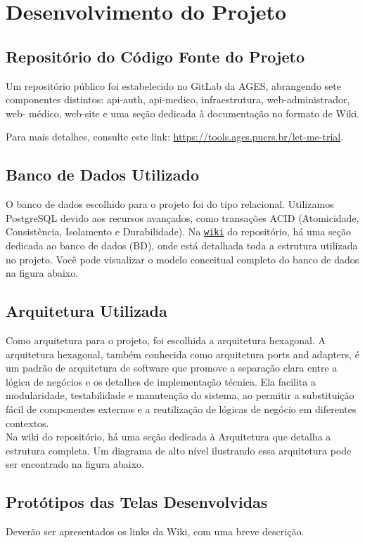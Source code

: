 \section[Desenvolvimento do Projeto]{Desenvolvimento do Projeto}



\subsection*{Repositório do Código Fonte do Projeto}
    Um repositório público foi estabelecido no GitLab da AGES, abrangendo sete componentes distintos: api-auth, api-medico, infraestrutura, web-administrador, web- médico, web-site e uma seção dedicada à documentação no formato de Wiki.

    Para mais detalhes, consulte este link:
    {\url{https://tools.ages.pucrs.br/let-me-trial}}.


\subsection{Banco de Dados Utilizado}
  O banco de dados escolhido para o projeto foi do tipo relacional. Utilizamos PostgreSQL devido aos recursos avançados, como transações ACID (Atomicidade, Consistência, Isolamento e Durabilidade). Na \texttt{\href{http://example.com}{wiki}} do repositório, há uma seção dedicada ao banco de dados (BD), onde está detalhada toda a estrutura utilizada no projeto. Você pode visualizar o modelo conceitual completo do banco de dados na figura abaixo.


\subsection{Arquitetura Utilizada}
  Como arquitetura para o projeto, foi escolhida a arquitetura hexagonal. A arquitetura hexagonal, também conhecida como arquitetura ports and adapters, é um padrão de arquitetura de software que promove a separação clara entre a lógica de negócios e os detalhes de implementação técnica. Ela facilita a modularidade, testabilidade e manutenção do sistema, ao permitir a substituição fácil de componentes externos e a reutilização de lógicas de negócio em diferentes contextos.\\
    Na wiki do repositório, há uma seção dedicada à Arquitetura que detalha a estrutura completa. Um diagrama de alto nível ilustrando essa arquitetura pode ser encontrado na figura abaixo.


\subsection{Protótipos das Telas Desenvolvidas}
  Deverão ser apresentados os links da Wiki, com uma breve descrição.

